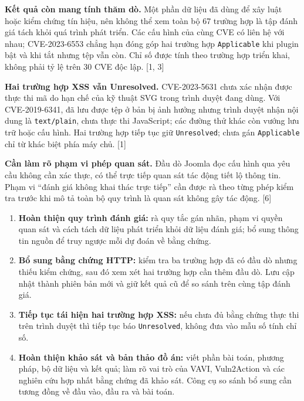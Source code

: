 \documentclass[12pt,a4paper]{article}
\makeatletter
\renewcommand\section{\@startsection{section}{1}{0pt}{12pt plus 2pt minus 1pt}{6pt}{\normalfont\fontsize{14}{18}\bfseries}}
\providecommand{\tightlist}{\setlength{\itemsep}{0pt}\setlength{\parskip}{0pt}}
\makeatother
\begin{document}
\textbf{Kết quả còn mang tính thăm dò.} Một phần dữ liệu đã dùng để xây luật hoặc kiểm chứng tín hiệu, nên không thể xem toàn bộ 67 trường hợp là tập đánh giá tách khỏi quá trình phát triển. Các cấu hình của cùng CVE có liên hệ với nhau; CVE-2023-6553 chẳng hạn đóng góp hai trường hợp \texttt{Applicable} khi plugin bật và khi tắt nhưng tệp vẫn còn. Chỉ số được tính theo trường hợp triển khai, không phải tỷ lệ trên 30 CVE độc lập. {[}1, 3{]}

\textbf{Hai trường hợp XSS vẫn Unresolved.} CVE-2023-5631 chưa xác nhận được thực thi mã do hạn chế của kỹ thuật SVG trong trình duyệt đang dùng. Với CVE-2019-6341, đã lưu được tệp ở bản bị ảnh hưởng nhưng trình duyệt nhận nội dung là \texttt{text/plain}, chưa thực thi JavaScript; các đường thử khác còn vướng lưu trữ hoặc cấu hình. Hai trường hợp tiếp tục giữ \texttt{Unresolved}; chưa gán \texttt{Applicable} chỉ từ khác biệt phía máy chủ. {[}1{]}

\textbf{Cần làm rõ phạm vi phép quan sát.} Đầu dò Joomla đọc cấu hình qua yêu cầu không cần xác thực, có thể trực tiếp quan sát tác động tiết lộ thông tin. Phạm vi ``đánh giá không khai thác trực tiếp'' cần được rà theo từng phép kiểm tra trước khi mô tả toàn bộ quy trình là quan sát không gây tác động. {[}6{]}

\section{Kế hoạch cho đợt tiếp theo}\label{kux1ebf-houx1ea1ch-cho-ux111ux1ee3t-tiux1ebfp-theo}

\begin{enumerate}
\def\labelenumi{\arabic{enumi}.}
\tightlist
\item
  \textbf{Hoàn thiện quy trình đánh giá:} rà quy tắc gán nhãn, phạm vi quyền quan sát và cách tách dữ liệu phát triển khỏi dữ liệu đánh giá; bổ sung thông tin nguồn để truy ngược mỗi dự đoán về bằng chứng.
\item
  \textbf{Bổ sung bằng chứng HTTP:} kiểm tra ba trường hợp đã có đầu dò nhưng thiếu kiểm chứng, sau đó xem xét hai trường hợp cần thêm đầu dò. Lưu cập nhật thành phiên bản mới và giữ kết quả cũ để so sánh trên cùng tập đánh giá.
\item
  \textbf{Tiếp tục tái hiện hai trường hợp XSS:} nếu chưa đủ bằng chứng thực thi trên trình duyệt thì tiếp tục báo \texttt{Unresolved}, không đưa vào mẫu số tính chỉ số.
\item
  \textbf{Hoàn thiện khảo sát và bản thảo đồ án:} viết phần bài toán, phương pháp, bộ dữ liệu và kết quả; làm rõ vai trò của VAVI, Vuln2Action và các nghiên cứu hợp nhất bằng chứng đã khảo sát. Công cụ so sánh bổ sung cần tương đồng về đầu vào, đầu ra và bài toán.
\end{enumerate}
\end{document}
